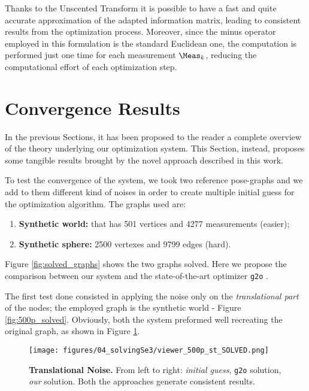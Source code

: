 Thanks to the Unscented Transform it is possible to have a fast and quite accurate approximation of the adapted information matrix, leading to consistent results from the optimization process. Moreover, since the minus operator employed in this formulation is the standard Euclidean one, the computation is performed just one time for each measurement $\Meas_{k}$, reducing the computational effort of each optimization step.

\section{Convergence Results}\label{sec:convergence_results}
In the previous Sections, it has been proposed to the reader a complete overview of the theory underlying our optimization system. This Section, instead, proposes some tangible results brought by the novel approach described in this work.

To test the convergence of the system, we took two reference pose-graphs and we add to them different kind of noises in order to create multiple initial guess for the optimization algorithm. The graphs used are:

\begin{enumerate}
    \item \textbf{Synthetic world:} that has 501 vertices and 4277 measurements (easier);
    \item \textbf{Synthetic sphere:} 2500 vertexes and 9799 edges (hard).
\end{enumerate}

\noindent Figure \ref{fig:solved_graphs} shows the two graphs solved.
Here we propose the comparison between our system and the state-of-the-art optimizer \texttt{g2o} \cite{kummerle2011g}.

The first test done consisted in applying the noise only on the \textit{translational part} of the nodes; the employed graph is the synthetic world - Figure \ref{fig:500p_solved}. Obviously, both the system preformed well recreating the original graph, as shown in Figure \ref{fig:500p_st_solution}.

\begin{figure}[!hbt]
    \centering
    \texttt{[image: figures/04\_solvingSe3/viewer\_500p\_st\_SOLVED.png]}
    \caption{\textbf{Translational Noise.} From left to right: \textit{initial guess}, \texttt{g2o} solution, \textit{our} solution. Both the approaches generate consistent results.} 
    \label{fig:500p_st_solution}
\end{figure}

